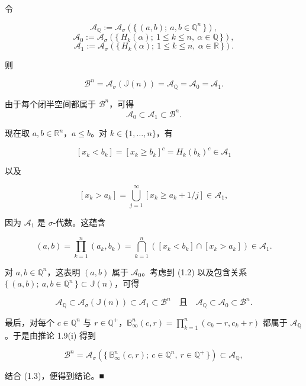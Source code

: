 \begin{theorem}

令

\[
\mathcal{A}_{\mathbb{Q}} := \mathcal{A}_{\sigma}\left(\{\, (a, b) ;\ a, b \in \mathbb{Q}^{n} \,\}\right) ,
\]
\[
\mathcal{A}_{0} := \mathcal{A}_{\sigma}\left(\{\, H_{k}(\alpha) ;\ 1 \le k \le n,\ \alpha \in \mathbb{Q} \,\}\right) ,
\]
\[
\mathcal{A}_{1} := \mathcal{A}_{\sigma}\left(\{\, H_{k}(\alpha) ;\ 1 \le k \le n,\ \alpha \in \mathbb{R} \,\}\right) .
\]

则

\[
\mathcal{B}^{n} = \mathcal{A}_{\sigma}(\mathbb{J}(n)) = \mathcal{A}_{\mathbb{Q}} = \mathcal{A}_{0} = \mathcal{A}_{1} .
\]

\proofhead
由于每个闭半空间都属于 $ \mathcal{B}^{n} $，可得
\begin{equation}
\mathcal{A}_{0} \subset \mathcal{A}_{1} \subset \mathcal{B}^{n} .\tag{1.2}
\end{equation}

现在取 $ a, b \in \mathbb{R}^{n} $，$ a \le b $。对 $ k \in \{1, \ldots, n\} $，有

\[
[x_{k} < b_{k}] = [x_{k} \ge b_{k}]^{c} = H_{k}(b_{k})^{c} \in \mathcal{A}_{1}
\]

以及

\[
[x_{k} > a_{k}] = \bigcup_{j=1}^{\infty} [x_{k} \ge a_{k} + 1/j] \in \mathcal{A}_{1} ,
\]

因为 $ \mathcal{A}_{1} $ 是 $ \sigma $-代数。这蕴含

\[
(a, b) = \prod_{k=1}^{n} (a_{k}, b_{k}) = \bigcap_{k=1}^{n} \left([x_{k} < b_{k}] \cap [x_{k} > a_{k}]\right) \in \mathcal{A}_{1} .
\]

对 $ a, b \in \mathbb{Q}^{n} $，这表明 $ (a, b) $ 属于 $ \mathcal{A}_{0} $。考虑到 (1.2) 以及包含关系 $ \{\, (a, b) ;\ a, b \in \mathbb{Q}^{n} \,\} \subset \mathbb{J}(n) $，可得

\begin{equation}
\mathcal{A}_{\mathbb{Q}} \subset \mathcal{A}_{\sigma}(\mathbb{J}(n)) \subset \mathcal{A}_{1} \subset \mathcal{B}^{n} \quad \text{且} \quad \mathcal{A}_{\mathbb{Q}} \subset \mathcal{A}_{0} \subset \mathcal{B}^{n} .\tag{1.3}
\end{equation}

最后，对每个 $ c \in \mathbb{Q}^{n} $ 与 $ r \in \mathbb{Q}^{+} $，$ \mathbb{B}_{\infty}^{n}(c, r) = \prod_{k=1}^{n} (c_{k} - r, c_{k} + r) $ 都属于 $ \mathcal{A}_{\mathbb{Q}} $。于是由推论 1.9(i) 得到

\[
\mathcal{B}^{n} = \mathcal{A}_{\sigma}\left(\{\, \mathbb{B}_{\infty}^{n}(c, r) ;\ c \in \mathbb{Q}^{n},\ r \in \mathbb{Q}^{+} \,\}\right) \subset \mathcal{A}_{\mathbb{Q}} ,
\]

结合 (1.3)，便得到结论。\nobreak\hspace{0.35em}■

\end{theorem}

